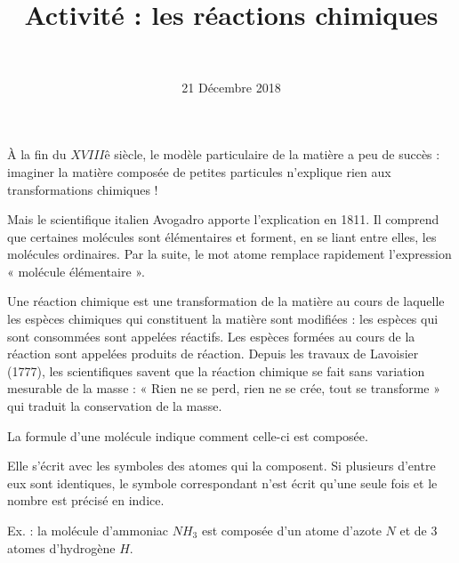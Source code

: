 \documentclass[a4paper,11pt]{exam}
\author{\ }
\date{21 Décembre 2018}
\title{Activité : les réactions chimiques }
\begin{document}
	\maketitle



\begin{doc}
	\caption{Avogadro et la <<molécule élémentaire>>}
	\label{doc:molecule}
	\`A la fin du $XVIIIê$ siècle, le modèle particulaire de la matière a peu de succès : imaginer la matière composée de petites particules n'explique rien aux transformations chimiques ! 
	
	Mais le scientifique italien Avogadro apporte l'explication en 1811. Il comprend que certaines molécules sont élémentaires et forment, en se liant entre elles, les molécules ordinaires. Par la suite, le mot atome remplace rapidement l’expression « molécule élémentaire ».
\end{doc}	

\begin{doc}
	\caption{Réaction chimique (Source : wikipédia)}
	\label{doc:reaction}
	
	Une réaction chimique est une transformation de la matière au cours de laquelle les espèces chimiques qui constituent la matière sont modifiées : les espèces qui sont consommées sont appelées réactifs. Les espèces formées au cours de la réaction sont appelées produits de réaction. Depuis les travaux de Lavoisier (1777), les scientifiques savent que la réaction chimique se fait sans variation mesurable de la masse : « Rien ne se perd, rien ne se crée, tout se transforme » qui traduit la conservation de la masse.
	
\end{doc}


\begin{doc}
	\caption{La formule d'une molécule}
	\label{doc:formule}
	
	La formule d’une molécule indique comment celle-ci est composée.
	
	Elle s’écrit avec les symboles des atomes qui la composent. Si plusieurs d’entre eux sont identiques, le symbole correspondant n’est écrit qu’une seule fois et le nombre est précisé en indice.
	
	Ex. : la molécule d’ammoniac $NH_3$ est composée d’un atome d’azote $N$ et de 3 atomes d’hydrogène $H$.
\end{doc}
\end{document}
